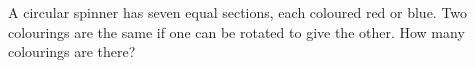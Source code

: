 A circular spinner has seven equal sections, each coloured red or blue. Two colourings are the same if one can be rotated to give the other. How many colourings are there?
